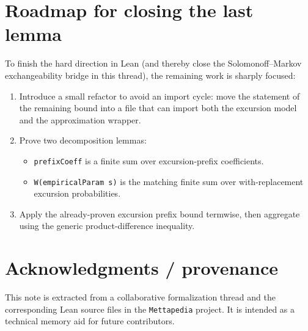 \documentclass[11pt]{article}
\newcommand{\1}{\mathbf{1}}
\begin{document}
\section{Roadmap for closing the last lemma}

To finish the hard direction in Lean (and thereby close the Solomonoff--Markov exchangeability bridge in this thread), the remaining work is sharply focused:

\begin{enumerate}[leftmargin=2em]
\item Introduce a small refactor to avoid an import cycle: move the statement of the remaining bound into a file that can import both the excursion model and the approximation wrapper.
\item Prove two decomposition lemmas:
  \begin{itemize}
  \item \texttt{prefixCoeff} is a finite sum over excursion-prefix coefficients.
  \item \texttt{W(empiricalParam s)} is the matching finite sum over with-replacement excursion probabilities.
  \end{itemize}
\item Apply the already-proven excursion prefix bound termwise, then aggregate using the generic product-difference inequality.
\end{enumerate}

\section*{Acknowledgments / provenance}

This note is extracted from a collaborative formalization thread and the corresponding Lean source files in the \texttt{Mettapedia} project.
It is intended as a technical memory aid for future contributors.
\end{document}
